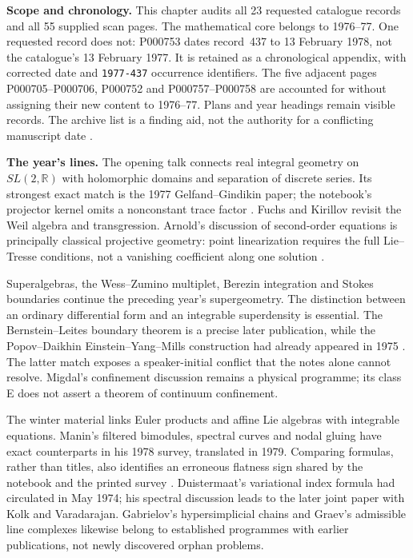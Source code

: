 \textbf{Scope and chronology.} This chapter audits all 23 requested catalogue
records and all 55 supplied scan pages. The mathematical core belongs to
1976--77. One requested record does not: P000753 dates record~437 to
13 February 1978, not the catalogue's 13 February 1977. It is retained as
a chronological appendix, with corrected date and \texttt{1977-437}
occurrence identifiers. The five adjacent pages P000705--P000706,
P000752 and P000757--P000758 are accounted for without assigning their
new content to 1976--77. Plans and year headings remain visible records.
The archive list is a finding aid, not the authority for a conflicting
manuscript date \citep{mccme2026seminararchive}.

\textbf{The year's lines.} The opening talk connects real integral geometry
on \(SL(2,\mathbb R)\) with holomorphic domains and separation of discrete
series. Its strongest exact match is the 1977 Gelfand--Gindikin paper;
the notebook's projector kernel omits a nonconstant trace factor
\citep[Eq.~22 and Proposition~9]{gelfandgindikin1977complex}. Fuchs and
Kirillov revisit the Weil algebra and transgression. Arnold's discussion
of second-order equations is principally classical projective geometry:
point linearization requires the full Lie--Tresse conditions, not a
vanishing coefficient along one solution
\citep[\S\S VII--VIII]{cartan1924projective}.

Superalgebras, the Wess--Zumino multiplet, Berezin integration and Stokes
boundaries continue the preceding year's supergeometry. The distinction
between an ordinary differential form and an integrable superdensity is
essential. The Bernstein--Leites boundary theorem is a precise later
publication, while the Popov--Daikhin Einstein--Yang--Mills construction
had already appeared in 1975
\citep{bernsteinleites1977integral,popovdaikhin1975einstein}.
The latter match exposes a speaker-initial conflict that the notes
alone cannot resolve. Migdal's confinement discussion remains a physical
programme; its class E does not assert a theorem of continuum confinement.

The winter material links Euler products and affine Lie algebras with
integrable equations. Manin's filtered bimodules, spectral curves and
nodal gluing have exact counterparts in his 1978 survey, translated in
1979. Comparing formulas, rather than titles, also identifies an erroneous
flatness sign shared by the notebook and the printed survey
\citep[Ch.~III, Theorem~2.6]{manin1978algebraic}.
Duistermaat's variational index formula had circulated in May 1974;
his spectral discussion leads to the later joint paper with Kolk and
Varadarajan. Gabrielov's hypersimplicial chains and Graev's admissible
line complexes likewise belong to established programmes with earlier
publications, not newly discovered orphan problems.

